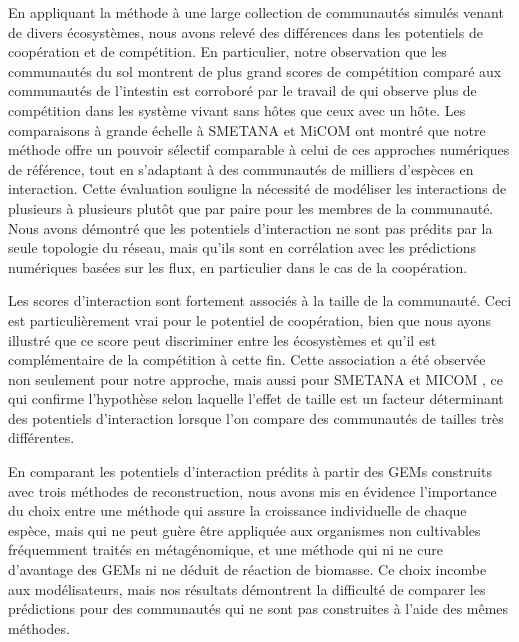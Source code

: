 En appliquant la méthode à une large collection de communautés simulés venant de divers écosystèmes, nous avons relevé des différences dans les potentiels de coopération et de compétition. En particulier, notre observation que les communautés du sol montrent de plus grand scores de compétition comparé aux communautés de l'intestin est corroboré par le travail de \citep{Machado2021} qui observe plus de compétition dans les système vivant sans hôtes que ceux avec un hôte. Les comparaisons à grande échelle à SMETANA \citep{Zelezniak2015} et MiCOM \citep{diener2020} ont montré que notre méthode offre un pouvoir sélectif comparable à celui de ces approches numériques de référence, tout en s'adaptant à des communautés de milliers d'espèces en interaction. Cette évaluation souligne la nécessité de modéliser les interactions de plusieurs à plusieurs plutôt que par paire pour les membres de la communauté. Nous avons démontré que les potentiels d'interaction ne sont pas prédits par la seule topologie du réseau, mais qu'ils sont en corrélation avec les prédictions numériques basées sur les flux, en particulier dans le cas de la coopération.

Les scores d'interaction sont fortement associés à la taille de la communauté. Ceci est particulièrement vrai pour le potentiel de coopération, bien que nous ayons illustré que ce score peut discriminer entre les écosystèmes et qu'il est complémentaire de la compétition à cette fin. Cette association a été observée non seulement pour notre approche, mais aussi pour SMETANA \citep{Zelezniak2015} et MICOM \citep{diener2020}, ce qui confirme l'hypothèse selon laquelle l'effet de taille est un facteur déterminant des potentiels d'interaction lorsque l'on compare des communautés de tailles très différentes.

En comparant les potentiels d'interaction prédits à partir des GEMs construits avec trois méthodes de reconstruction, nous avons mis en évidence l'importance du choix entre une méthode qui assure la croissance individuelle de chaque espèce, mais qui ne peut guère être appliquée aux organismes non cultivables fréquemment traités en métagénomique, et une méthode qui ni ne cure d'avantage des GEMs ni ne déduit de réaction de biomasse. Ce choix incombe aux modélisateurs, mais nos résultats démontrent la difficulté de comparer les prédictions pour des communautés qui ne sont pas construites à l'aide des mêmes méthodes.

